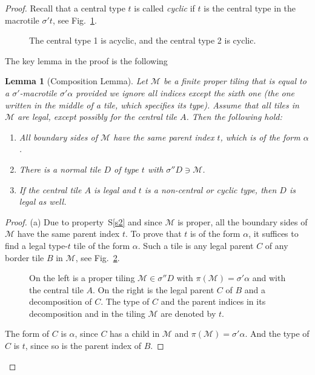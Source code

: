 \documentclass[10pt,a4paper]{amsart}
\newtheorem{lemma}{Lemma}
\begin{document}
\begin{proof}
Recall that a central type $t$ is called \emph{cyclic} if $t$ is the central type in the macrotile $\sigma' t$, see Fig.~\ref{f34}.
\begin{figure}
\begin{center}
\hskip 2.5cm 
\end{center}
\caption{The central type 1 is acyclic, and the central type 2 is cyclic.}\label{f34}
\end{figure}
The key lemma in the proof is the following 
\begin{lemma}[Composition Lemma]\label{l9}
Let $\mathcal M$ be a finite proper tiling 
that is equal to a $\sigma'$-macrotile 
$\sigma' \alpha$  provided we ignore all indices except the sixth one (the one written in the
middle of a tile, which specifies its type).
Assume that all tiles in $\mathcal M$ are legal, except possibly for the  central tile $A$. 
    Then the following hold: 
    \begin{enumerate}
    \item[(a)] All boundary sides of  $\mathcal M$ have the same parent index $t$, which is of the form $\alpha$.
  \item[(b)] There is a normal tile $D$ of type $t$ with $\sigma''D\ni\mathcal M$.
      
    \item[(c)] If the central tile $A$ is legal and  $t$ is a non-central or cyclic type, then $D$ is legal as well.
    \end{enumerate}
  \end{lemma}
  \begin{proof}
    (a) Due to property~S\ref{s2} and since $\mathcal M$ is proper, all the boundary sides of  $\mathcal M$ have the same parent index $t$. To prove that $t$ is of the form $\alpha$, 
it suffices to find a legal type-$t$ tile of the form $\alpha$.
   Such a tile is any legal parent $C$ of any border tile $B$ in $\mathcal M$,
   see Fig.~\ref{f8}.
    \begin{figure}
      \begin{center}
        
      \end{center}
      \caption{On the left is a proper tiling $\mathcal M\in \sigma'' D$ with $\pi(\mathcal M)=\sigma'\alpha$ 
and with the  central tile $A$. 
        On the right is the legal parent $C$ of $B$ and a decomposition of $C$. 
        The type of $C$
        and the parent indices in its decomposition and in the tiling $\mathcal M$ are  denoted
        by $t$.
}\label{f8}
    \end{figure}
   The form of $C$ is $\alpha$, since $C$ has a child in $\mathcal M$ and $\pi(\mathcal M)=\sigma'\alpha$. And the type of $C$ is $t$, since so is
 the parent index of $B$.
    


\end{proof}
\end{proof}
\end{document}
